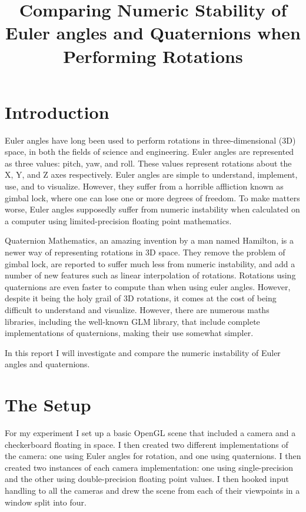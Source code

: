 \documentclass[a4paper]{article}
\title{Comparing Numeric Stability of Euler angles and Quaternions when Performing Rotations}
\author{}
\date{}
\begin{document}
\maketitle

\section{Introduction}

Euler angles have long been used to perform rotations in three-dimensional (3D) space, in both the fields of science and engineering. Euler angles are represented as three values: pitch, yaw, and roll. These values represent rotations about the X, Y, and Z axes respectively. Euler angles are simple to understand, implement, use, and to visualize. However, they suffer from a horrible affliction known as gimbal lock, where one can lose one or more degrees of freedom. To make matters worse, Euler angles supposedly suffer from numeric instability when calculated on a computer using limited-precision floating point mathematics.

Quaternion Mathematics, an amazing invention by a man named Hamilton, is a newer way of representing rotations in 3D space. They remove the problem of gimbal lock, are reported to suffer much less from numeric instability, and add a number of new features such as linear interpolation of rotations. Rotations using quaternions are even faster to compute than when using euler angles. However, despite it being the holy grail of 3D rotations, it comes at the cost of being difficult to understand and visualize. However, there are numerous maths libraries, including the well-known GLM library, that include complete implementations of quaternions, making their use somewhat simpler.

In this report I will investigate and compare the numeric instability of Euler angles and quaternions.

\section{The Setup}

For my experiment I set up a basic OpenGL scene that included a camera and a checkerboard floating in space. I then created two different implementations of the camera: one using Euler angles for rotation, and one using quaternions. I then created two instances of each camera implementation: one using single-precision and the other using double-precision floating point values. I then hooked input handling to all the cameras and drew the scene from each of their viewpoints in a window split into four.
\end{document}
